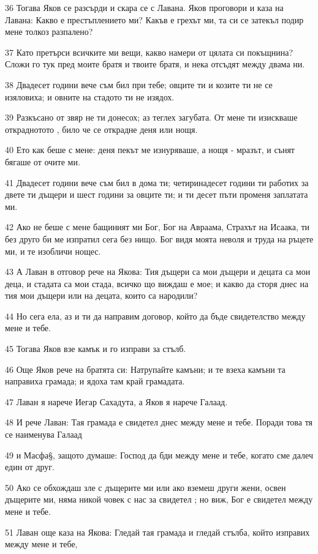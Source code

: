 \par 36 Тогава Яков се разсърди и скара се с Лавана. Яков проговори и каза на Лавана: Какво е престъплението ми? Какъв е грехът ми, та си се затекъл подир мене толкоз разпалено?
\par 37 Като претърси всичките ми вещи, какво намери от цялата си покъщнина? Сложи го тук пред моите братя и твоите братя, и нека отсъдят между двама ни.
\par 38 Двадесет години вече съм бил при тебе; овците ти и козите ти не се изяловиха; и овните на стадото ти не изядох.
\par 39 Разкъсано от звяр не ти донесох; аз теглех загубата. От мене ти изискваше откраднотото , било че се открадне деня или нощя.
\par 40 Ето как беше с мене: деня пекът ме изнуряваше, а нощя - мразът, и сънят бягаше от очите ми.
\par 41 Двадесет години вече съм бил в дома ти; четиринадесет години ти работих за двете ти дъщери и шест години за овците ти; и ти десет пъти променя заплатата ми.
\par 42 Ако не беше с мене бащиният ми Бог, Бог на Авраама, Страхът на Исаака, ти без друго би ме изпратил сега без нищо. Бог видя моята неволя и труда на ръцете ми, и те изобличи нощес.
\par 43 А Лаван в отговор рече на Якова: Тия дъщери са мои дъщери и децата са мои деца, и стадата са мои стада, всичко що виждаш е мое; и какво да сторя днес на тия мои дъщери или на децата, които са народили?
\par 44 Но сега ела, аз и ти да направим договор, който да бъде свидетелство между мене и тебе.
\par 45 Тогава Яков взе камък и го изправи за стълб.
\par 46 Още Яков рече на братята си: Натрупайте камъни; и те взеха камъни та направиха грамада; и ядоха там край грамадата.
\par 47 Лаван я нарече Иегар Сахадута, а Яков я нарече Галаад.
\par 48 И рече Лаван: Тая грамада е свидетел днес между мене и тебе. Поради това тя се наименува Галаад
\par 49 и Масфа§, защото думаше: Господ да бди между мене и тебе, когато сме далеч един от друг.
\par 50 Ако се обхождаш зле с дъщерите ми или ако вземеш други жени, освен дъщерите ми, няма никой човек с нас за свидетел ; но виж, Бог е свидетел между мене и тебе.
\par 51 Лаван още каза на Якова: Гледай тая грамада и гледай стълба, който изправих между мене и тебе,
